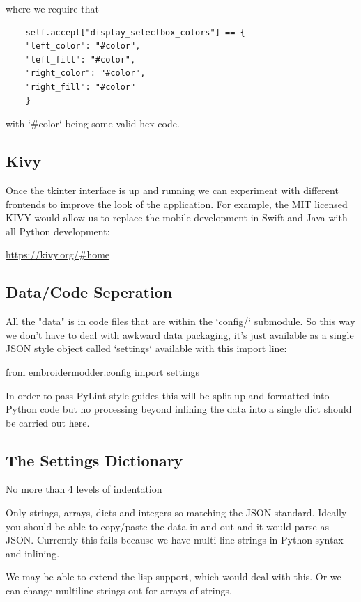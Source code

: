 \documentclass[a4paper]{report}
\begin{document}
where we require that

\begin{lstlisting}
    self.accept["display_selectbox_colors"] == {
    "left_color": "#color",
    "left_fill": "#color",
    "right_color": "#color",
    "right_fill": "#color"
    }
\end{lstlisting}

with `\#color` being some valid hex code.

\subsection{Kivy}

Once the tkinter interface is up and running we can experiment
with different frontends to improve the look of the application.
For example, the MIT licensed KIVY would allow us to replace the 
mobile development in Swift and Java with all Python development:

\url{https://kivy.org/#home}

\subsection{Data/Code Seperation}

All the "data" is in code files that are within the `config/`
submodule. So this way we don't have to deal with awkward data
packaging, it's just available as a single JSON style object
called `settings` available with this import line:

    from embroidermodder.config import settings

In order to pass PyLint style guides this will be split up and
formatted into Python code but no processing beyond inlining
the data into a single dict should be carried out here.

\subsection{The Settings Dictionary}

No more than 4 levels of indentation

Only strings, arrays, dicts and integers so matching the JSON standard. Ideally you should be able to copy/paste the data in and out and it would parse as JSON. Currently this fails because we have multi-line strings in Python syntax and inlining.

We may be able to extend the lisp support, which would deal with this. Or we can change multiline strings out for arrays of strings.
\end{document}
